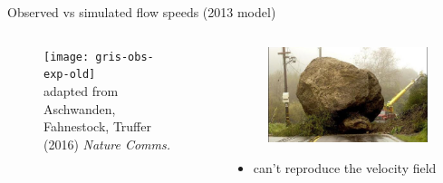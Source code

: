\documentclass[hide notes,intlimits]{beamer}
\begin{document}
\begin{frame}{Observed vs simulated flow speeds (2013 model)}
  \begin{columns}[c]
    \begin{column}{.6\linewidth}
    \begin{figure}
      \texttt{[image: gris-obs-exp-old]}
      \\ \tiny{adapted from Aschwanden, Fahnestock, Truffer (2016) \textit{Nature Comms.}}
    \end{figure}
    \end{column}
    \begin{column}{.4\linewidth}
      \begin{figure}
        \includegraphics[width=\textwidth]{roadblocks}
      \end{figure}
      \begin{itemize}
      \item can't reproduce the velocity field
      \end{itemize}
    \end{column}
  \end{columns}
  \note[item]{}
\end{frame}
\end{document}
